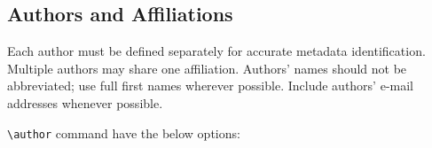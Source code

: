 \documentclass[
]{ceurart}
\begin{document}





\subsection{Authors and Affiliations}

Each author must be defined separately for accurate metadata
identification. Multiple authors may share one affiliation. Authors'
names should not be abbreviated; use full first names wherever
possible. Include authors' e-mail addresses whenever possible.

\verb|\author| command have the below options:
\end{document}
